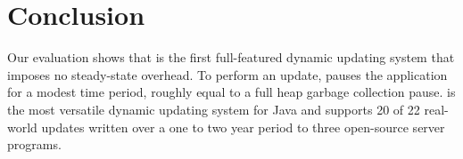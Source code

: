 








\section{Conclusion}

Our evaluation shows that
\JV is the first full-featured dynamic updating system that imposes no
steady-state overhead. To perform an update, \JV pauses the application
for a modest time period, roughly equal to a full heap garbage collection
pause. \JV is the most versatile dynamic updating system for Java and
supports 20 of 22 real-world updates written over a one to two year period
to three open-source server programs.
